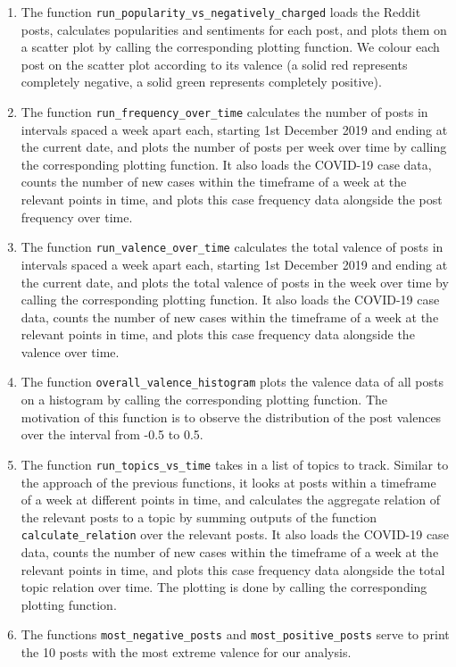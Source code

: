 \documentclass[fontsize=11pt]{article}
\begin{document}
\begin{enumerate}
    \item The function \texttt{run\_popularity\_vs\_negatively\_charged} loads the Reddit posts, calculates popularities and sentiments for each post, and plots them on a scatter plot by calling the corresponding plotting function. We colour each post on the scatter plot according to its valence (a solid red represents completely negative, a solid green represents completely positive). 
    
    \item The function \texttt{run\_frequency\_over\_time} calculates the number of posts in intervals spaced a week apart each, starting 1st December 2019 and ending at the current date, and plots the number of posts per week over time by calling the corresponding plotting function. It also loads the COVID-19 case data, counts the number of new cases within the timeframe of a week at the relevant points in time, and plots this case frequency data alongside the post frequency over time. 
    
    \item The function \texttt{run\_valence\_over\_time} calculates the total valence of posts in intervals spaced a week apart each, starting 1st December 2019 and ending at the current date, and plots the total valence of posts in the week over time by calling the corresponding plotting function. It also loads the COVID-19 case data, counts the number of new cases within the timeframe of a week at the relevant points in time, and plots this case frequency data alongside the valence over time. 
    
    \item The function \texttt{overall\_valence\_histogram} plots the valence data of all posts on a histogram by calling the corresponding plotting function. The motivation of this function is to observe the distribution of the post valences over the interval from -0.5 to 0.5. 
    
    \item The function \texttt{run\_topics\_vs\_time} takes in a list of topics to track. Similar to the approach of the previous functions, it looks at posts within a timeframe of a week at different points in time, and calculates the aggregate relation of the relevant posts to a topic by summing outputs of the function \texttt{calculate\_relation} over the relevant posts. It also loads the COVID-19 case data, counts the number of new cases within the timeframe of a week at the relevant points in time, and plots this case frequency data alongside the total topic relation over time. The plotting is done by calling the corresponding plotting function.
    
    \item The functions \texttt{most\_negative\_posts} and \texttt{most\_positive\_posts} serve to print the 10 posts with the most extreme valence for our analysis. 
\end{enumerate}
\end{document}
